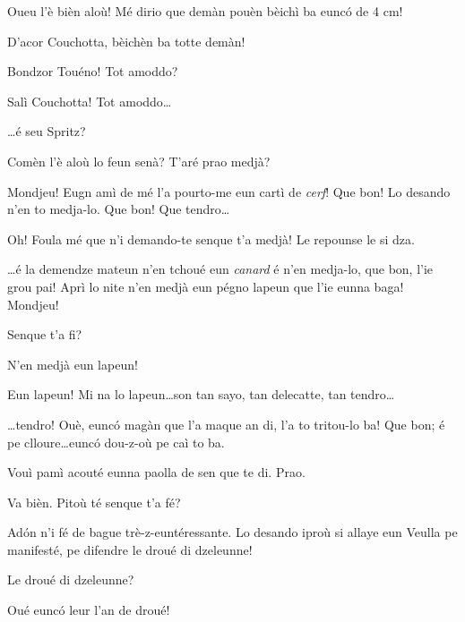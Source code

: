 \begin{drama}
\Gerominespeaks{} Oueu l'è bièn aloù! Mé dirio que  demàn pouèn bèichì ba eunc\'o de 4 cm!

\Sandrinospeaks D’acor Couchotta, bèichèn ba totte demàn!


\Gerominespeaks{} Bondzor Touéno! Tot amoddo?

\Tuenospeaks Salì Couchotta! Tot amoddo\ldots

\Gerominespeaks{} \ldots é seu Spritz?


\Gerominespeaks{} Comèn l'è aloù lo feun senà? T'aré prao medjà?

\Tuenospeaks Mondjeu! Eugn amì de mé l'a pourto-me eun cartì de \textit{cerf}! Que bon! Lo desando n'en to medja-lo. Que bon! Que tendro\ldots

\Gerominespeaks Oh! Foula mé que n'i demando-te senque t'a medjà! Le repounse le si dza.

\Tuenospeaks \ldots é la demendze mateun n'en tchoué eun \textit{canard} é n'en medja-lo, que bon, l'ie grou pai! Aprì lo nite n'en medjà eun pégno lapeun que l'ie eunna baga! Mondjeu!

\Gerominespeaks	{} Senque t'a fi?

\Tuenospeaks N'en medjà eun lapeun!

\Gerominespeaks Eun lapeun! Mi na lo lapeun\ldots son tan sayo, tan delecatte, tan tendro\ldots

\Tuenospeaks \ldots tendro! Ouè, eunc\'o magàn que l'a maque an di, l'a to tritou-lo ba! Que bon; é pe clloure\ldots eunc\'o dou-z-où pe caì to ba.

\Gerominespeaks Vouì pamì acouté eunna paolla de sen que te di. Prao.

\Tuenospeaks Va bièn. Pitoù té senque t'a fé? 

\Gerominespeaks{} Ad\'on n'i fé de bague trè-z-euntéressante. Lo desando iproù si allaye eun Veulla pe manifesté, pe difendre le droué di dzeleunne! 

\Tuenospeaks{} Le droué di dzeleunne?

\Gerominespeaks Oué eunc\'o leur l'an de droué!


\end{drama}
